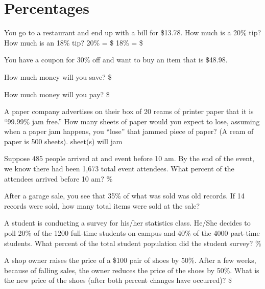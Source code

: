 \documentclass{ximera}
\begin{document}
\section{Percentages}
  \begin{exercise}
 You go to a restaurant and end up with a bill for \$13.78.  How much is a 20\% tip?  How much is an 18\% tip? 
 20\% = \$
 18\% = \$
 \end{exercise}
   \begin{exercise}
 You have a coupon for 30\% off and want to buy an item that is \$48.98. 

How much money will you save? \$

How much money will you pay? \$
 \end{exercise}
   \begin{exercise}
 A paper company advertises on their box of 20 reams of printer paper that it is “99.99\% jam free.”  How many sheets of paper would you expect to lose, assuming when a paper jam happens, you “lose” that jammed piece of paper?  (A ream of paper is 500 sheets). 
  sheet(s) will jam
 \end{exercise}
   \begin{exercise}
 Suppose 485 people arrived at and event before 10 am.  By the end of the event, we know there had been 1,673 total event attendees.  What percent of the attendees arrived before 10 am? 
 \%
 \end{exercise}
   \begin{exercise}
 After a garage sale, you see that 35\% of what was sold was old records.  If 14 records were sold, how many total items were sold at the sale? 
 \end{exercise}
   \begin{exercise}
 A student is conducting a survey for his/her statistics class. He/She decides to poll 20\% of the 1200 full-time students on campus and 40\% of the 4000 part-time students.  What percent of the total student population did the student survey? \%
 \end{exercise}
\begin{exercise}
 A shop owner raises the price of a \$100 pair of shoes by 50\%. After a few weeks, because of falling sales, the owner reduces the price of the shoes by 50\%.
 What is the new price of the shoes (after both percent changes have occurred)?
 \$
\end{exercise}
\end{document}
